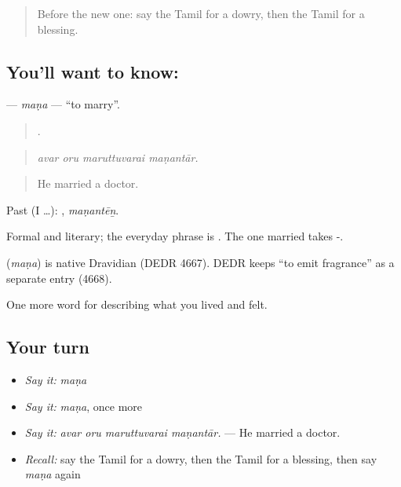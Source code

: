 \label{lesson:TA-C499-mana}



\begin{quote}
Before the new one: say the Tamil for a dowry, then the Tamil for a blessing.
\end{quote}

\subsection*{You'll want to know: }
\textbf{} — \emph{maṇa} — \textquotedblleft{}to marry\textquotedblright{}.

\begin{quote}
   .
\end{quote}

\begin{quote}
\emph{avar oru maruttuvarai maṇantār.}
\end{quote}

\begin{quote}
He married a doctor.
\end{quote}

Past (I …): , \emph{maṇantēṉ}.

Formal and literary; the everyday phrase is  . The one married takes -.

\begin{cousinweb}
\textbf{} (\emph{maṇa}) is native Dravidian (DEDR 4667). DEDR keeps  \textquotedblleft{}to emit fragrance\textquotedblright{} as a separate entry (4668).
\end{cousinweb}

\begin{grammarlens}[title={What you've built}]
One more word for describing what you lived and felt.
\end{grammarlens}

\subsection*{Your turn}
\begin{itemize}
\raggedright
  \item \emph{Say it:} \emph{maṇa}
  \item \emph{Say it:} \emph{maṇa}, once more
  \item \emph{Say it:} \emph{avar oru maruttuvarai maṇantār.} — He married a doctor.
  \item \emph{Recall:} say the Tamil for a dowry, then the Tamil for a blessing, then say \emph{maṇa} again
\end{itemize}

